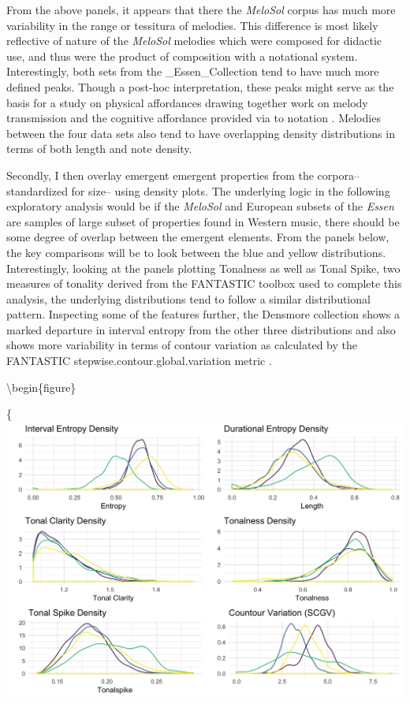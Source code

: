 \documentclass[]{book}
\begin{document}
From the above panels, it appears that there the \emph{MeloSol} corpus has much more variability in the range or tessitura of melodies.
This difference is most likely reflective of nature of the \emph{MeloSol} melodies which were composed for didactic use, and thus were the product of composition with a notational system.
Interestingly, both sets from the \_Essen\_Collection tend to have much more defined peaks.
Though a post-hoc interpretation, these peaks might serve as the basis for a study on physical affordances drawing together work on melody transmission \citep{shanahanExaminingEffectOral2019} and the cognitive affordance provided via to notation \citep{lerdahlCognitiveConstraintsCompositional1992}.
Melodies between the four data sets also tend to have overlapping density distributions in terms of both length and note density.

Secondly, I then overlay emergent emergent properties from the corpora-- standardized for size-- using density plots.
The underlying logic in the following exploratory analysis would be if the \emph{MeloSol} and European subsets of the \emph{Essen} are samples of large subset of properties found in Western music, there should be some degree of overlap between the emergent elements.
From the panels below, the key comparisons will be to look between the blue and yellow distributions.
Interestingly, looking at the panels plotting Tonalness as well as Tonal Spike, two measures of tonality derived from the FANTASTIC toolbox used to complete this analysis, the underlying distributions tend to follow a similar distributional pattern.
Inspecting some of the features further, the Densmore collection shows a marked departure in interval entropy from the other three distributions and also shows more variability in terms of contour variation as calculated by the FANTASTIC stepwise.contour.global.variation metric \citep{mullensiefenFantasticFeatureANalysis2009}.

\textbackslash{}begin\{figure\}

\{\centering \includegraphics[width=1\linewidth]{img/corpora_emergent}
\end{document}
